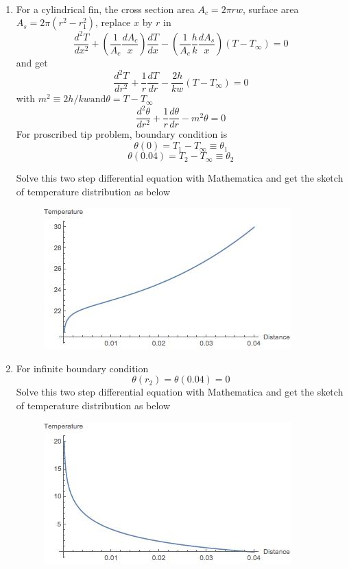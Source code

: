 \begin{solution}
~\\
\begin{enumerate}
\item For a cylindrical fin, the cross section area $A_c=2\pi rw$,
surface area $A_s=2\pi(r^2-r_1^2)$, replace $x$ by $r$ in
$$
\frac{d^2 T}{dx^2} + 
\left(\frac{1}{A_c}\frac{dA_c}{x}\right)\frac{dT}{dx}-
\left(\frac{1}{A_c}\frac{h}{k}\frac{dA_s}{x}\right)(T-T_\infty)=0
$$
and get
$$
\frac{d^2 T}{dr^2}+
\frac{1}{r}\frac{dT}{dr}-
\frac{2h}{kw}(T-T_\infty)=0
$$
with $m^2 \equiv 2h/kw \text{and} \theta=T-T_\infty$
$$
\frac{d^2 \theta}{dr^2}+
\frac{1}{r}\frac{d\theta}{dr}-
m^2\theta=0
$$
For proscribed tip problem, boundary condition is 
$$\theta(0)=T_1-T_\infty \equiv \theta_1$$
$$\theta(0.04)=T_2-T_\infty \equiv \theta_2$$

Solve this two step differential equation with Mathematica and get the sketch of temperature distribution as below
\begin{figure}[h!]
  \centering
    \includegraphics[scale=0.6]{figures/ch2/17}
\end{figure}
\item For infinite boundary condition
$$\theta(r_2)=\theta(0.04)=0$$
Solve this two step differential equation with Mathematica and get the sketch of temperature distribution as below
\begin{figure}[h!]
  \centering
    \includegraphics[scale=0.6]{figures/ch2/18}
\end{figure}
\end{enumerate}
\end{solution}

















